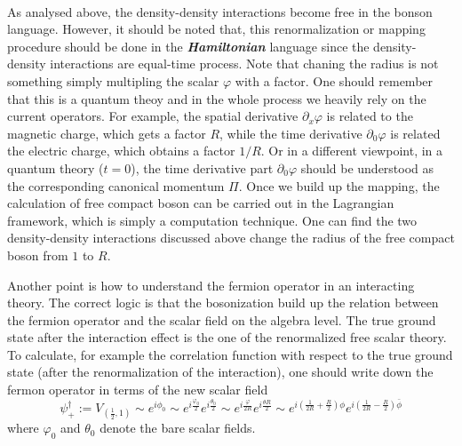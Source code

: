  \\
As analysed above, the density-density interactions become free in the bonson language.
However, it should be noted that, this renormalization or mapping procedure should be 
done in the \textbf{\textit{Hamiltonian}} language since the density-density
interactions are equal-time process. Note that chaning the radius is not something
simply multipling the scalar $\varphi$ with a factor. One should remember that this is
a quantum theoy and in the whole process we heavily rely on the current operators. For 
example, the spatial derivative $\partial_x \varphi$ is related to the magnetic charge, 
which gets a factor $R$, while the time derivative $\partial_0\varphi$ is related the 
electric charge, which obtains a factor $1/R$. Or in a different viewpoint, in a 
quantum theory ($t=0$), the time derivative part $\partial_0\varphi$ should be 
understood as the corresponding canonical momentum $\Pi$. Once we build up the 
mapping, the calculation of free compact boson can be carried out in the Lagrangian 
framework, which is simply a computation technique. One can find the two 
density-density interactions discussed above change the radius of the free compact 
boson from $1$ to $R$. 

Another point is how to understand the fermion operator in an interacting theory. The correct logic is that the bosonization build up the relation between the fermion operator and the scalar field on the algebra level. The true ground state after the interaction effect is the one of the renormalized free scalar theory. To calculate, for example the correlation function with respect to the true ground state (after the renormalization of the interaction), one should write down the fermon operator in terms of the new scalar field 
\begin{equation}
	\psi_{+}^\dagger := V_{(\frac{1}{2},1)}\sim e^{i\phi_0} \sim e^{i\frac{\varphi_0}{2}} e^{i\frac{\theta_0}{2}} \sim e^{i\frac{\varphi}{2R}}e^{i\frac{\theta R}{2}} \sim e^{i\left(\frac{1}{2R}+\frac{R}{2}\right)\phi}e^{i\left(\frac{1}{2R}-\frac{R}{2}\right)\bar{\phi}}
\end{equation} 
where $\varphi_0$ and $\theta_0$ denote the bare scalar fields.


